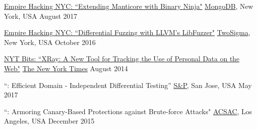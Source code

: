 

\begin{cvhonorswide}
\cvhonorwide
    {}
    {\href{https://www.meetup.com/Empire-Hacking/events/239192018}{Empire
            Hacking NYC: ``Extending Manticore with Binary Ninja"}}
    {\href{https://www.mongodb.com/}{MongoDB}, New York, USA}
    {August 2017}

  \cvhonorwide
    {}
    {\href{https://www.meetup.com/Empire-Hacking/events/231863227/?_af=event&_af_eid=231863227&https=on}{Empire
            Hacking NYC: ``Differential Fuzzing with LLVM's LibFuzzer"}}
    {\href{https://www.twosigma.com/}{TwoSigma}, New York, USA}
    {October 2016}
\end{cvhonorswide}



\begin{cvhonorswide2}
  \cvhonorwide
    {}
    {\href{http://bits.blogs.nytimes.com/2014/08/18/xray-a-new-tool-for-tracking-the-use-of-personal-data-on-the-web/}{NYT Bits:
    ``XRay: A New Tool for Tracking the Use of Personal Data on the Web"}}
    {\href{http://www.nytimes.com/}{The New York Times}}
    {August 2014}
\end{cvhonorswide2}


\begin{cvhonorswide2}

    \cvhonorwide
    {}
    {``\nezha: Efficient Domain - Independent Differential Testing''}
    {\href{https://www.ieee-security.org/TC/SP2017/}{S\&P}, San Jose, USA}
    {May 2017}

  \cvhonorwide
    {}
    {``\dynaguard: Armoring Canary-Based Protections against Brute-force Attacks"}
    {\href{https://www.acsac.org/2015/}{ACSAC}, Los Angeles, USA}
    {December 2015}

\end{cvhonorswide2}

